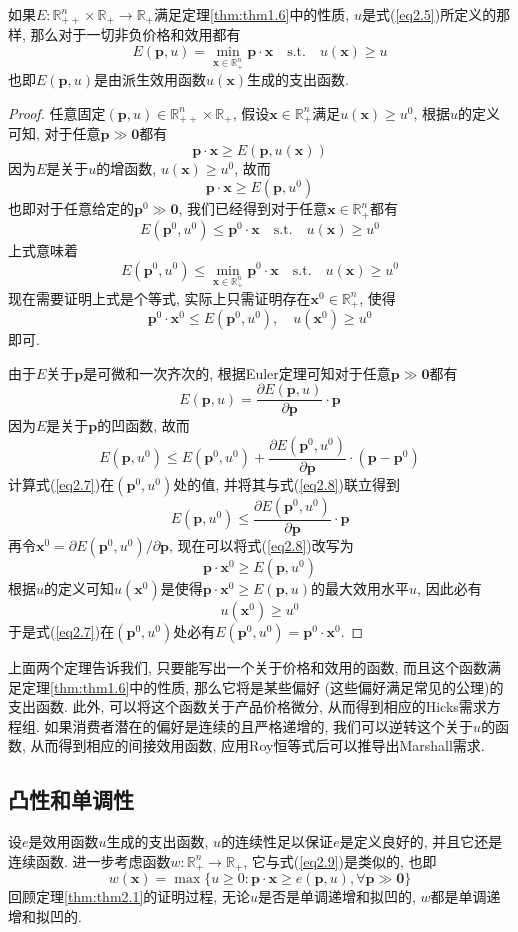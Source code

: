 \documentclass[cn, 12pt, math=mtpro2, bibstyle=apa, blue, twocol]{elegantbook}
\newcommand{\R}{\mathbb{R}}
\newcommand{\p}{\mathbf{p}}
\newcommand{\x}{\mathbf{x}}
\begin{document}
\begin{theorem}\label{thm:thm2.2}
  如果$E:\R_{++}^n\times\R_+\to\R_+$满足定理\ref{thm:thm1.6}中的性质, $u$是式(\ref{eq2.5})所定义的那样, 那么对于一切非负价格和效用都有
  $$E(\p,u)=\min_{\x\in\R_+^n}\p\cdot\x\quad\text{s.t.}\quad u(\x)\geq u$$
  也即$E(\p,u)$是由派生效用函数$u(\x)$生成的支出函数.
\end{theorem}
\begin{proof}
  任意固定$(\p,u)\in\R_{++}^n\times\R_+$, 假设$\x\in\R_+^n$满足$u(\x)\geq u^0$, 根据$u$的定义可知, 对于任意$\p\gg\mathbf{0}$都有
  $$\p\cdot\x\geq E(\p,u(\x))$$
  因为$E$是关于$u$的增函数, $u(\x)\geq u^0$, 故而
  $$\p\cdot\x\geq E(\p,u^0)$$
  也即对于任意给定的$\p^0\gg\mathbf{0}$, 我们已经得到对于任意$\x\in\R_+^n$都有
  $$E(\p^0,u^0)\leq \p^0\cdot\x\quad\text{s.t.}\quad u(\x)\ge u^0$$
  上式意味着
  $$E(\p^0,u^0)\leq\min_{\x\in\R_+^n}\p^0\cdot\x\quad\text{s.t.}\quad u(\x)\geq u^0$$
  现在需要证明上式是个等式, 实际上只需证明存在$\x^0\in\R_+^n$, 使得
  \begin{equation}\label{eq2.6}
    \p^0\cdot\x^0\leq E(\p^0,u^0),\quad u(\x^0)\geq u^0
  \end{equation}
  即可. 
  
  由于$E$关于$\p$是可微和一次齐次的, 根据Euler定理可知对于任意$\p\gg\mathbf{0}$都有
  \begin{equation}\label{eq2.7}
    E(\p,u)=\frac{\partial E(\p,u)}{\partial\p}\cdot\p
  \end{equation}
  因为$E$是关于$\p$的凹函数, 故而
  \begin{equation}\label{eq2.8}
    E(\p,u^0)\leq E(\p^0,u^0)+\frac{\partial E(\p^0,u^0)}{\partial\p}\cdot(\p-\p^0)
  \end{equation}
  计算式(\ref{eq2.7})在$(\p^0,u^0)$处的值, 并将其与式(\ref{eq2.8})联立得到
  $$E(\p,u^0)\leq \frac{\partial E(\p^0,u^0)}{\partial\p}\cdot\p$$
  再令$\x^0=\partial E(\p^0,u^0)/\partial \p$, 现在可以将式(\ref{eq2.8})改写为
  $$\p\cdot\x^0\geq E(\p,u^0)$$
  根据$u$的定义可知$u(\x^0)$是使得$\p\cdot\x^0\geq E(\p,u)$的最大效用水平$u$, 因此必有$$u(\x^0)\geq u^0$$于是式(\ref{eq2.7})在$(\p^0,u^0)$处必有$E(\p^0,u^0)=\p^0\cdot\x^0$.
\end{proof}
上面两个定理告诉我们, 只要能写出一个关于价格和效用的函数, 而且这个函数满足定理\ref{thm:thm1.6}中的性质, 那么它将是某些偏好 (这些偏好满足常见的公理)的支出函数. 此外, 可以将这个函数关于产品价格微分, 从而得到相应的Hicks需求方程组. 如果消费者潜在的偏好是连续的且严格递增的, 我们可以逆转这个关于$u$的函数, 从而得到相应的间接效用函数, 应用Roy恒等式后可以推导出Marshall需求.
\subsection{凸性和单调性}
设$e$是效用函数$u$生成的支出函数, $u$的连续性足以保证$e$是定义良好的, 并且它还是连续函数. 进一步考虑函数$w:\R_+^n\to\R_+$, 它与式(\ref{eq2.9})是类似的, 也即
\begin{equation}\label{eq2.10}
  w(\x)=\max\{u\ge0:\p\cdot\x\ge e(\p,u),\forall\p\gg\mathbf{0}\}
\end{equation}
回顾定理\ref{thm:thm2.1}的证明过程, 无论$u$是否是单调递增和拟凹的, $w$都是单调递增和拟凹的.
\end{document}

